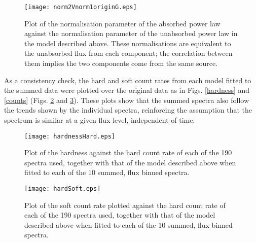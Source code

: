 \documentclass[useAMS,usenatbib]{sam}
\begin{document}
\begin{figure}
	
	\texttt{[image: norm2Vnorm1originG.eps]}\hspace{1pt}
	\caption{Plot of the normalisation parameter of the absorbed power law 
		against the normalisation parameter of the unabsorbed power law in
		the model described above. These normalisations are equivalent to the unabsorbed flux from
	        each component; the correlation between them implies the two components come from the same source.}
	
	\label{normplots}
\end{figure}  
		


As a consistency check, the hard and soft count rates from each model fitted to the summed data were plotted over the original data as in Figs. \ref{hardness} and
\ref{counts}  (Figs. \ref{modelhardness} and \ref{modelcounts}). These plots show that the summed spectra also follow the trends shown by the individual spectra,
reinforcing the assumption that the spectrum is similar at a given flux level, independent of time.



\begin{figure}

	\texttt{[image: hardnessHard.eps]}
	
	\caption{Plot of the hardness against the hard count rate of each of the 190 spectra used, together with that of the model described above when fitted to each
of the 10 summed, flux binned spectra.}
	\label{modelhardness}
	
\end{figure}

\begin{figure}

	\texttt{[image: hardSoft.eps]}
	
	\caption{Plot of the soft count rate plotted against the hard count rate of each of the 190 spectra used, together with that of the model described above when
fitted to each of the 10 summed, flux binned spectra.}
	\label{modelcounts}
	
\end{figure}
\end{document}
